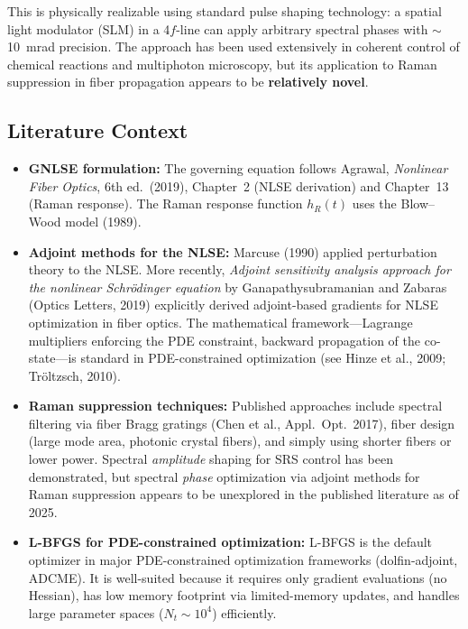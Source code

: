 \documentclass[12pt,a4paper]{article}
\theoremstyle{definition}
\begin{document}
This is physically realizable using standard pulse shaping technology: a spatial light modulator (SLM) in a 4$f$-line can apply arbitrary spectral phases with $\sim$10~mrad precision. The approach has been used extensively in coherent control of chemical reactions and multiphoton microscopy, but its application to Raman suppression in fiber propagation appears to be \textbf{relatively novel}.

\subsection{Literature Context}

\begin{itemize}[leftmargin=*]
\item \textbf{GNLSE formulation:} The governing equation follows Agrawal, \emph{Nonlinear Fiber Optics}, 6th ed.\ (2019), Chapter~2 (NLSE derivation) and Chapter~13 (Raman response). The Raman response function $h_R(t)$ uses the Blow--Wood model (1989).

\item \textbf{Adjoint methods for the NLSE:} Marcuse (1990) applied perturbation theory to the NLSE. More recently, \emph{Adjoint sensitivity analysis approach for the nonlinear Schr\"odinger equation} by Ganapathysubramanian and Zabaras (Optics Letters, 2019) explicitly derived adjoint-based gradients for NLSE optimization in fiber optics. The mathematical framework---Lagrange multipliers enforcing the PDE constraint, backward propagation of the co-state---is standard in PDE-constrained optimization (see Hinze et al., 2009; Tr\"oltzsch, 2010).

\item \textbf{Raman suppression techniques:} Published approaches include spectral filtering via fiber Bragg gratings (Chen et al., Appl.\ Opt.\ 2017), fiber design (large mode area, photonic crystal fibers), and simply using shorter fibers or lower power. Spectral \emph{amplitude} shaping for SRS control has been demonstrated, but spectral \emph{phase} optimization via adjoint methods for Raman suppression appears to be unexplored in the published literature as of 2025.

\item \textbf{L-BFGS for PDE-constrained optimization:} L-BFGS is the default optimizer in major PDE-constrained optimization frameworks (dolfin-adjoint, ADCME). It is well-suited because it requires only gradient evaluations (no Hessian), has low memory footprint via limited-memory updates, and handles large parameter spaces ($N_t \sim 10^4$) efficiently.
\end{itemize}
\end{document}
